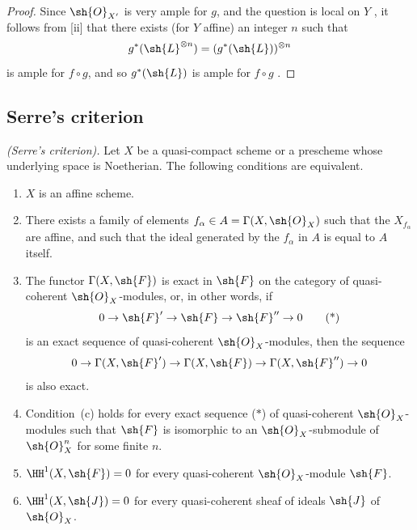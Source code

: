 \begin{proof}
Since $\sh{O}_{X'}$ is very ample for $g$, and the question is local on $Y$ , it follows from [ii] that there exists (for $Y$ affine) an integer $n$ such that
\[
  g^*(\sh{L}^{\otimes n})=(g^*(\sh{L}))^{\otimes n}
\]
is ample for $f\circ g$, and so $g^*(\sh{L})$ is ample for $f\circ g$ .
\end{proof}

\subsection{Serre's criterion}
\label{subsection:II.5.2}

\begin{theorem}[5.2.1]
\label{II.5.2.1}
\emph{(Serre's criterion).}
Let $X$ be a quasi-compact scheme or a prescheme whose underlying space is Noetherian.
The following conditions are equivalent.
\begin{enumerate}
  \item[{\rm(a)}] $X$ is an affine scheme.
  \item[{\rm(b)}] There exists a family of elements $f_\alpha\in A=\Gamma(X,\sh{O}_X)$ such that the $X_{f_\alpha}$ are affine, and such that the ideal generated by the $f_\alpha$ in $A$ is equal to $A$ itself.
  \item[{\rm(c)}] The functor $\Gamma(X,\sh{F})$ is exact in $\sh{F}$ on the category of quasi-coherent $\sh{O}_X$-modules, or, in other words, if
    \[
      0\to\sh{F}'\to\sh{F}\to\sh{F}''\to 0
      \tag{*}
    \]
    is an exact sequence of quasi-coherent $\sh{O}_X$-modules, then the sequence
    \[
     0\to\Gamma(X,\sh{F}')\to\Gamma(X,\sh{F})\to\Gamma(X,\sh{F}'')\to 0
    \]
    is also exact.
  \item[{\rm(c')}] Condition~{\rm(c)} holds for every exact sequence {\rm($*$)} of quasi-coherent $\sh{O}_X$-modules such that $\sh{F}$ is isomorphic to an $\sh{O}_X$-submodule of $\sh{O}_X^n$ for some finite $n$.
  \item[{\rm(d)}] $\HH^1(X,\sh{F})=0$ for every quasi-coherent $\sh{O}_X$-module $\sh{F}$.
  \item[{\rm(d$'$)}] $\HH^1(X,\sh{J})=0$ for every quasi-coherent sheaf of ideals $\sh{J}$ of $\sh{O}_X$.
\end{enumerate}
\end{theorem}

